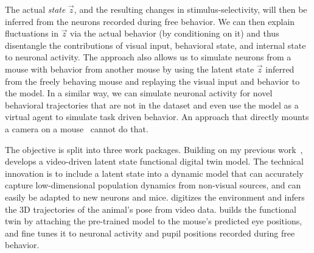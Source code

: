 \documentclass[B2,COG]{ercgrant}
\begin{document}
The actual \textit{state} $\vec{z}$, and the resulting changes in stimulus-selectivity, will then be inferred from the neurons recorded during free behavior. We can then explain fluctuations in $\vec{z}$ via the actual behavior (by conditioning on it) and thus disentangle the contributions of visual input, behavioral state, and internal state to neuronal activity. 
 The approach also allows us to simulate neurons from a mouse with behavior from another mouse by using the latent state $\vec{z}$ inferred from the freely behaving mouse and replaying the visual input and behavior to the model. 
 In a similar way, we can simulate neuronal activity for novel behavioral trajectories that are not in the dataset and even use the model as a virtual agent to simulate task driven behavior. An approach that directly mounts a camera on a mouse~\parencite{Parker2022-ac} cannot do that. 


The objective is split into three work packages. 
Building on my previous work~\parencite{Sinz2018-sk, Bashiri2021-or},  develops a video-driven latent state functional digital twin model. 
The technical innovation is to include a latent state into a dynamic model that can accurately capture low-dimensional population dynamics from non-visual sources, and can easily be adapted to new neurons and mice. 
 digitizes the environment and infers the 3D trajectories of the animal's pose from video data.
 builds the functional twin by attaching the pre-trained model to the mouse's predicted eye positions, and fine  tunes it to neuronal activity and pupil positions recorded during free behavior.
\end{document}
